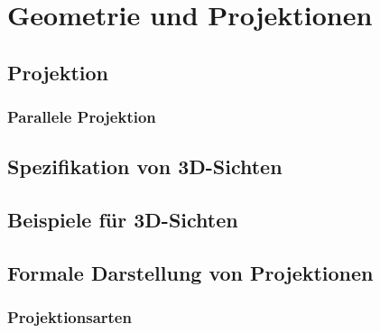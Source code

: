 \chapter{Geometrie und Projektionen}

\section{Projektion}
\subsection{Parallele Projektion}

\section{Spezifikation von 3D-Sichten}

\section{Beispiele für 3D-Sichten}

\section{Formale Darstellung von Projektionen}
\subsection{Projektionsarten}

